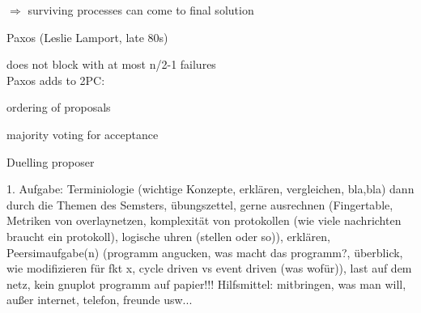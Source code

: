 \documentclass[ngerman,a4paper]{report}
\begin{document}
\begin{compactitem}
\begin{compactitem}
		$\Rightarrow$ surviving processes can come to final solution
	\end{compactitem}
	\item Paxos (Leslie Lamport, late 80s)
	\begin{compactitem}
		\item does not block with at most n/2-1 failures\\
		Paxos adds to 2PC:
		\begin{compactitem}
			\item ordering of proposals
			\item majority voting for acceptance
		\end{compactitem}
		Duelling proposer
	\end{compactitem}
\end{compactitem}


1. Aufgabe: Terminiologie (wichtige Konzepte, erklären, vergleichen, bla,bla)
dann durch die Themen des Semsters, übungszettel, gerne ausrechnen (Fingertable, Metriken von overlaynetzen, komplexität von protokollen (wie viele nachrichten braucht ein protokoll), logische uhren (stellen oder so)), erklären, Peersimaufgabe(n) (programm angucken, was macht das programm?, überblick, wie modifizieren für fkt x, cycle driven vs event driven (was wofür)), last auf dem netz, kein gnuplot programm auf papier!!!
Hilfsmittel: mitbringen, was man will, außer internet, telefon, freunde usw...
\end{document}
